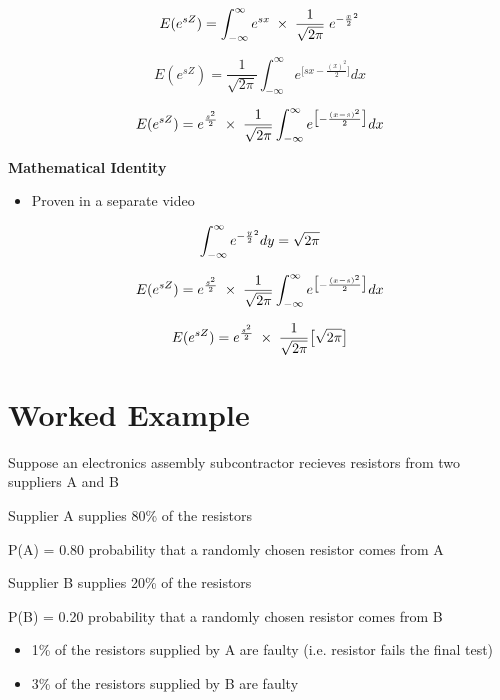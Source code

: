\documentclass[12pt]{report}
\begin{document}
{{	
	
	
	{
		\LARGE
		\[ E( e^{sZ} ) =  \int_{-\infty}^{\infty}  e^{sx} \;\times\; \frac{1}{\sqrt{2\pi}} \;e^{ -{x \over 2}^2 }\]
	}

	
	
	{
		\LARGE
		\[ E( e^{sZ} ) =  \frac{1}{\sqrt{2\pi}} \int_{-\infty}^{\infty}   e^{ \big[sx-\frac{(x)^2}{2} \big]} dx   \]
	}
	

	
	
	{
		\LARGE
		\[ E( e^{sZ} ) =  e^{{s^2\over 2}} \; \times\; \frac{1}{\sqrt{2\pi}} \int_{-\infty}^{\infty} e^{ \big[-\frac{(x-s)^2}{2} \big]} dx   \]
	}
	
	

	\textbf{Mathematical Identity}
	\begin{itemize}
		\item Proven in a separate video
	\end{itemize}
	{
		\LARGE
		\[\int_{-\infty}^{\infty} e^{-{y\over 2}^2}dy  = \sqrt{2\pi}\]
		
	}
	

	
	
	{
		\LARGE
		\[ E( e^{sZ} ) =  e^{{s^2\over 2}} \; \times\; \frac{1}{\sqrt{2\pi}} \int_{-\infty}^{\infty} e^{ \big[-\frac{(x-s)^2}{2} \big]} dx \]
		
		
		\[ E( e^{sZ} ) =  e^{{s^2\over 2}} \; \times\; \frac{1}{\sqrt{2\pi}} \big[\sqrt{2\pi} \big] \]
	}
	
	
\section{Worked Example}	
		
		\Large
	Suppose an electronics assembly subcontractor recieves resistors from two suppliers A and B
	
	Supplier A supplies 80\% of the resistors
	
	P(A) = 0.80 probability that a randomly chosen resistor comes from A
	
	Supplier B supplies 20\% of the resistors
	
	P(B) = 0.20 probability that a randomly chosen resistor comes from B
	
	

	\begin{itemize}
		\item 1\% of the resistors supplied by A are faulty (i.e. resistor fails the final test)
		\item 3\% of the resistors supplied by B are faulty 
	\end{itemize}
	
}}
\end{document}
